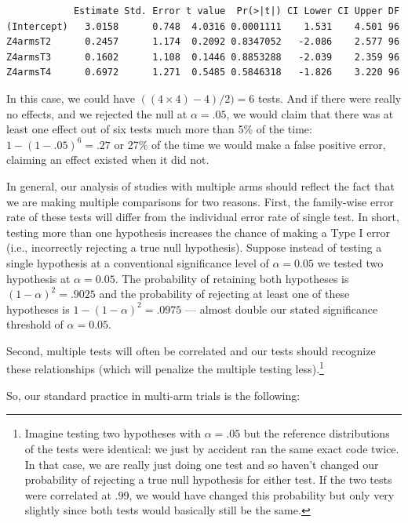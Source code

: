 \documentclass[
  12pt,
]{book}
\theoremstyle{definition}
\theoremstyle{definition}
\theoremstyle{definition}
\theoremstyle{remark}
\begin{document}
\begin{verbatim}
            Estimate Std. Error t value  Pr(>|t|) CI Lower CI Upper DF
(Intercept)   3.0158      0.748  4.0316 0.0001111    1.531    4.501 96
Z4armsT2      0.2457      1.174  0.2092 0.8347052   -2.086    2.577 96
Z4armsT3      0.1602      1.108  0.1446 0.8853288   -2.039    2.359 96
Z4armsT4      0.6972      1.271  0.5485 0.5846318   -1.826    3.220 96
\end{verbatim}

In this case, we could have \(((4 \times 4)-4)/2)=6\) tests. And if
there were really no effects, and we rejected the null at
\(\alpha=.05\), we would claim that there was at least one effect out of
six tests much more than 5\% of the time: \(1 - ( 1 - .05)^6 = .27\) or
27\% of the time we would make a false positive error, claiming an
effect existed when it did not.

In general, our analysis of studies with multiple arms should reflect
the fact that we are making multiple comparisons for two reasons. First,
the family-wise error rate of these tests will differ from the
individual error rate of single test. In short, testing more than one
hypothesis increases the chance of making a Type I error (i.e.,
incorrectly rejecting a true null hypothesis). Suppose instead of
testing a single hypothesis at a conventional significance level of
\(\alpha = 0.05\) we tested two hypothesis at \(\alpha = 0.05\). The
probability of retaining both hypotheses is \((1-\alpha)^2 = .9025\) and
the probability of rejecting at least one of these hypotheses is
\(1-(1-\alpha)^2 = .0975\) --- almost double our stated significance
threshold of \(\alpha = 0.05\).

Second, multiple tests will often be correlated and our tests should
recognize these relationships (which will penalize the multiple testing
less).\footnote{Imagine testing two hypotheses with \(\alpha = .05\) but
  the reference distributions of the tests were identical: we just by
  accident ran the same exact code twice. In that case, we are really
  just doing one test and so haven't changed our probability of
  rejecting a true null hypothesis for either test. If the two tests
  were correlated at .99, we would have changed this probability but
  only very slightly since both tests would basically still be the same.}

So, our standard practice in multi-arm trials is the following:
\end{document}
